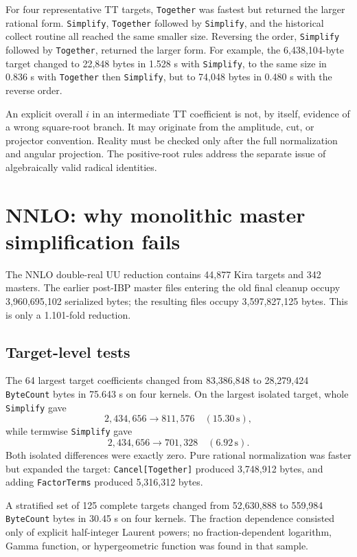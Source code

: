 \documentclass[11pt]{article}
\newcommand{\code}[1]{\texttt{#1}}
\newcommand{\Sec}{\,\mathrm{s}}
\begin{document}
For four representative TT targets, \code{Together} was fastest but returned
the larger rational form.  \code{Simplify}, \code{Together} followed by
\code{Simplify}, and the historical collect routine all reached the same
smaller size.  Reversing the order, \code{Simplify} followed by
\code{Together}, returned the larger form.  For example, the 6,438,104-byte
target changed to 22,848 bytes in 1.528 s with \code{Simplify}, to the same
size in 0.836 s with \code{Together} then \code{Simplify}, but to 74,048 bytes
in 0.480 s with the reverse order.

An explicit overall $i$ in an intermediate TT coefficient is not, by itself,
evidence of a wrong square-root branch.  It may originate from the amplitude,
cut, or projector convention.  Reality must be checked only after the full
normalization and angular projection.  The positive-root rules address the
separate issue of algebraically valid radical identities.

\section{NNLO: why monolithic master simplification fails}

The NNLO double-real UU reduction contains 44,877 Kira targets and 342
masters.  The earlier post-IBP master files entering the old final cleanup
occupy 3,960,695,102 serialized bytes; the resulting files occupy
3,597,827,125 bytes.  This is only a 1.101-fold reduction.

\subsection{Target-level tests}

The 64 largest target coefficients changed from 83,386,848 to 28,279,424
\code{ByteCount} bytes in 75.643 s on four kernels.  On the largest isolated
target, whole \code{Simplify} gave
\begin{equation}
  2{,}434{,}656\to811{,}576\quad(15.30\Sec),
\end{equation}
while termwise \code{Simplify} gave
\begin{equation}
  2{,}434{,}656\to701{,}328\quad(6.92\Sec).
\end{equation}
Both isolated differences were exactly zero.  Pure rational normalization was
faster but expanded the target: \code{Cancel[Together]} produced 3,748,912
bytes, and adding \code{FactorTerms} produced 5,316,312 bytes.

A stratified set of 125 complete targets changed from 52,630,888 to 559,984
\code{ByteCount} bytes in 30.45 s on four kernels.  The fraction dependence
consisted only of explicit half-integer Laurent powers; no
fraction-dependent logarithm, Gamma function, or hypergeometric function was
found in that sample.
\end{document}
